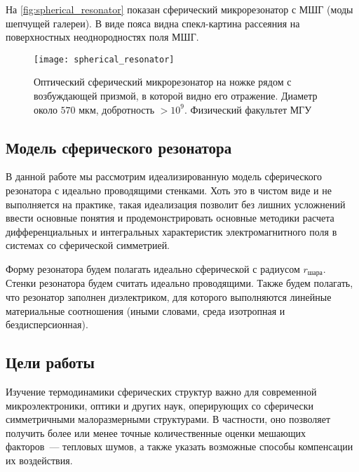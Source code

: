     На \autoref{fig:spherical_resonator} показан сферический микрорезонатор с МШГ (моды шепчущей галереи). В виде пояса видна спекл-картина рассеяния на поверхностных неоднородностях поля МШГ.
    \begin{figure}[h]
        \centering
        \texttt{[image: spherical\_resonator]}
        \caption[]{Оптический сферический микрорезонатор на ножке рядом с возбуждающей призмой, в которой видно его отражение. Диаметр около $570$ мкм, добротность $> 10^9$. Физический факультет МГУ \cite{microresonators}}
        \label{fig:spherical_resonator}
    \end{figure}

%
%
%
%
%
%

\subsection{Модель сферического резонатора}

    В данной работе мы рассмотрим идеализированную модель сферического резонатора с идеально проводящими стенками. Хоть это в чистом виде и не выполняется на практике, такая идеализация позволит без лишних усложнений ввести основные понятия и продемонстрировать основные методики расчета дифференциальных и интегральных характеристик электромагнитного поля в системах со сферической симметрией.

    Форму резонатора будем полагать идеально сферической с радиусом $r_\text{шара}$. Стенки резонатора будем считать идеально проводящими. Также будем полагать, что резонатор заполнен диэлектриком, для которого выполняются линейные материальные соотношения (иными словами, среда изотропная и бездисперсионная).

%
%
%
%
%
%

\subsection{Цели работы}

    Изучение термодинамики сферических структур важно для современной микроэлектроники, оптики и других наук, оперирующих со сферически симметричными малоразмерными структурами. В частности, оно позволяет получить более или менее точные количественные оценки мешающих факторов~--- тепловых шумов, а также указать возможные способы компенсации их воздействия.

